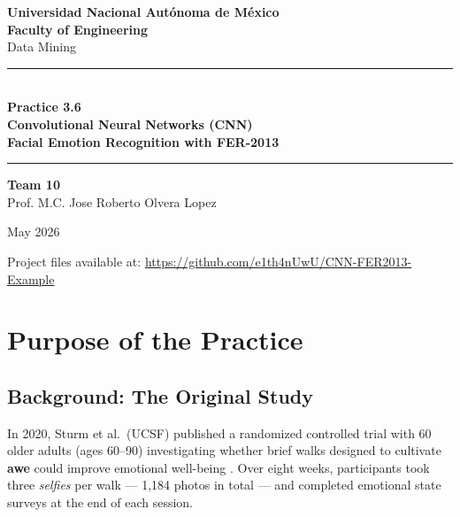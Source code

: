 \documentclass[12pt, a4paper]{article}
\begin{document}
\begin{titlepage}
  \centering
  \vspace*{1.5cm}

  {\Large\bfseries Universidad Nacional Autónoma de México\\[0.3em]
  Faculty of Engineering}\\[0.8em]
  {\large Data Mining}

  \vspace{2cm}
  \rule{\linewidth}{0.6pt}\\[0.6em]
  {\LARGE\bfseries Practice 3.6\\[0.4em]
  Convolutional Neural Networks (CNN)\\[0.3em]
  \large Facial Emotion Recognition with FER-2013}\\[0.4em]
  \rule{\linewidth}{0.6pt}

  \vspace{2cm}

  {\large\textbf{Team 10}}\\[0.5em]
  {\large Prof. M.C. Jose Roberto Olvera Lopez}\\[1.5em]

  \vspace{2cm}

  {\large May 2026}

  \vfill
  {\small Project files available at: \url{https://github.com/e1th4nUwU/CNN-FER2013-Example}}
\end{titlepage}

\tableofcontents
\newpage

\section{Purpose of the Practice}

\subsection{Background: The Original Study}

In 2020, Sturm et al.\ (UCSF) published a randomized controlled trial with 60 older adults
(ages 60--90) investigating whether brief walks designed to cultivate \textbf{awe} could
improve emotional well-being \cite{sturm2022}. Over eight weeks, participants took three
\textit{selfies} per walk --- 1,184 photos in total --- and completed emotional state surveys
at the end of each session.
\end{document}
